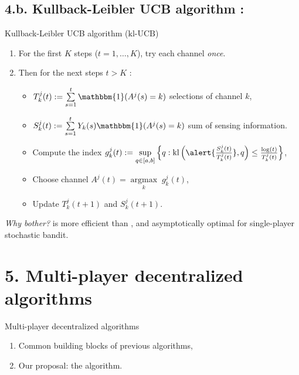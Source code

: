 \documentclass[12pt,english,ignorenonframetext,aspectratio=169,]{beamer}
\providecommand{\tightlist}{%
  \setlength{\itemsep}{0pt}\setlength{\parskip}{0pt}}
\begin{document}
\subsection{\hfill{}4.b. Kullback-Leibler UCB algorithm : \klUCB\hfill{}}

\begin{frame}{Kullback-Leibler UCB algorithm
(\(\mathrm{kl}\)-\(\mathrm{UCB}\))}

\begin{enumerate}
\def\labelenumi{\arabic{enumi}.}
\tightlist
\item
  For the first \(K\) steps (\(t=1,\dots,K\)), try each channel
  \emph{once}.
\item
  Then for the next steps \(t > K\) :

  \begin{itemize}
  \tightlist
  \item
  \(T_k^j(t) := \sum\limits_{s=1}^{t} \mathbbm{1}(A^j(s) = k)\) selections of channel \(k\),
  \item
  \(S_k^j(t) := \sum\limits_{s=1}^{t} Y_{k}(s) \mathbbm{1}(A^j(s) = k)\) sum of sensing information.
  \item
    Compute the index
    \(g_k^j(t) := \sup\limits_{q \in [a, b]} \left\{ q : \mathrm{kl}\left(\alert{\frac{S_k^j(t)}{T_k^j(t)}}, q\right) \leq \frac{\log(t)}{T_k^j(t)} \right\}\),
  \item
    Choose channel \(A^j(t) = \mathop{\arg\max}\limits_{k} \; g_k^j(t)\),
  \item
    Update \(T_k^j(t+1)\) and \(S_k^j(t+1)\).
  \end{itemize}
\end{enumerate}

{\small \emph{Why bother?} \klUCB{} is more
efficient than \UCB{}, and asymptotically optimal for single-player
stochastic bandit.
}

\end{frame}



\section{\hfill{}5. Multi-player decentralized algorithms\hfill{}}

\begin{frame}{Multi-player decentralized algorithms}

\begin{enumerate}
\def\labelenumi{\arabic{enumi}.}
\tightlist
\item
  Common building blocks of previous algorithms,\vspace*{15pt}
\item
  Our proposal: the \MCTopM{} algorithm.
\end{enumerate}

\end{frame}
\end{document}
